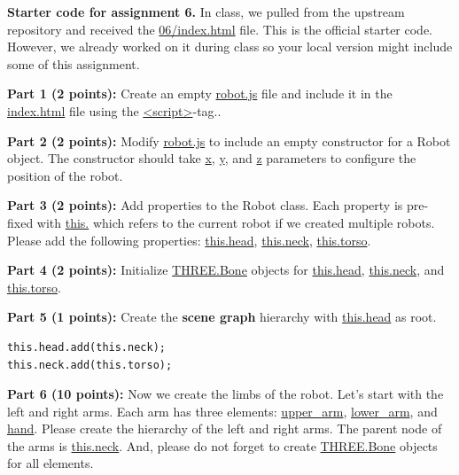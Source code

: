\documentclass[10pt,oneside,onecolumn,letterpaper]{article}
\begin{document}
\vspace{.5cm}

\noindent\textbf{Starter code for assignment 6.} In class, we pulled from the upstream repository and received the \url{06/index.html} file. This is the official starter code. However, we already worked on it during class so your local version might include some of this assignment.

\vspace{.5cm}


\noindent\textbf{Part 1 (2 points):} Create an empty \url{robot.js} file and include it in the \url{index.html} file using the \url{<script>}-tag..

\vspace{.5cm}

\noindent\textbf{Part 2 (2 points):} Modify \url{robot.js} to include an empty constructor for a Robot object. The constructor should take \url{x}, \url{y}, and \url{z} parameters to configure the position of the robot.

\vspace{.5cm}

\noindent\textbf{Part 3 (2 points):} Add properties to the Robot class. Each property is pre-fixed with \url{this.} which refers to the current robot if we created multiple robots. Please add the following properties: \url{this.head}, \url{this.neck}, \url{this.torso}.

\vspace{.5cm}

\noindent\textbf{Part 4 (2 points):} Initialize \url{THREE.Bone} objects for \url{this.head}, \url{this.neck}, and \url{this.torso}.

\clearpage

\noindent\textbf{Part 5 (1 points):} Create the \textbf{scene graph} hierarchy with \url{this.head} as root.

\vspace{.5cm}

\begin{verbatim}
this.head.add(this.neck);
this.neck.add(this.torso);
\end{verbatim}

\vspace{.5cm}

\noindent\textbf{Part 6 (10 points):} Now we create the limbs of the robot. Let's start with the left and right arms. Each arm has three elements: \url{upper_arm}, \url{lower_arm}, and \url{hand}. Please create the hierarchy of the left and right arms. The parent node of the arms is \url{this.neck}. And, please do not forget to create \url{THREE.Bone} objects for all elements.
\end{document}
